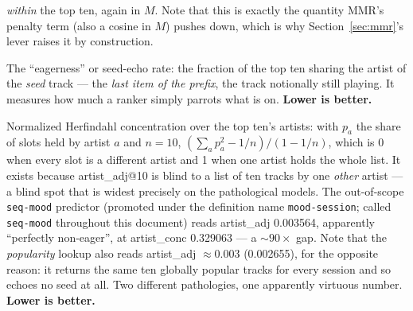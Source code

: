 \documentclass[11pt]{article}
\begin{document}
\begin{description}
  \emph{within} the top ten, again in $M$. Note that this is exactly the
  quantity MMR's penalty term (also a cosine in $M$) pushes down, which is why
  Section~\ref{sec:mmr}'s lever raises it by construction.
  \item[artist\_adj@10 ($\downarrow$).] The ``eagerness'' or seed-echo rate: the
  fraction of the top ten sharing the artist of the \emph{seed} track --- the
  \emph{last item of the prefix}, the track notionally still playing. It measures
  how much a ranker simply parrots what is on. \textbf{Lower is better.}
  \item[artist\_conc@10 ($\downarrow$).] Normalized Herfindahl concentration
  over the top ten's artists: with $p_a$ the share of slots held by artist $a$
  and $n=10$, $(\sum_a p_a^2 - 1/n)/(1-1/n)$, which is \num{0} when every slot
  is a different artist and \num{1} when one artist holds the whole list. It
  exists because artist\_adj@10 is blind to a list of ten tracks by one
  \emph{other} artist --- a blind spot that is widest precisely on the
  pathological models. The out-of-scope \texttt{seq-mood} predictor (promoted
  under the definition name \texttt{mood-session}; called \texttt{seq-mood}
  throughout this document) reads artist\_adj \num{0.003564}, apparently
  ``perfectly non-eager'', at artist\_conc \num{0.329063} --- a ${\sim}90\times$
  gap. Note that the \emph{popularity} lookup also reads artist\_adj
  ${\approx}\num{0.003}$ (\num{0.002655}), for the opposite reason: it returns
  the same ten globally popular tracks for every session and so echoes no seed at
  all. Two different pathologies, one apparently virtuous number.
  \textbf{Lower is better.}
\end{description}
\end{document}
